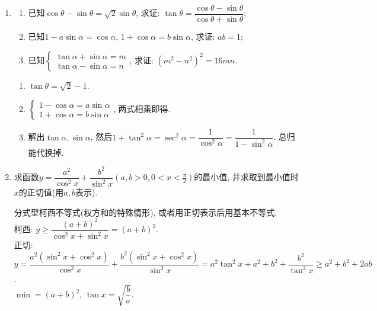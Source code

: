 \begin{enumerate}
\begin{jieda}
\begin{enumerate}[(1)]
\item $\iff\sin\alpha+\cos\alpha=2\sin\alpha-2\cos\alpha\iff\tan\alpha=3$. \\
$E=\dfrac{\sin\alpha\cos\alpha}{\sin^2\alpha+\cos^2\alpha}=\dfrac{\tan\alpha}{\tan^2\alpha+1}=\dfrac{3}{10}$. 
\end{enumerate}
\end{jieda}

\item
\begin{enumerate}[(1)]
\item 已知$\cos\theta-\sin\theta=\sqrt{2}\sin\theta$, 求证: $\tan\theta=\dfrac{\cos\theta-\sin\theta}{\cos\theta+\sin\theta}$;
\item 已知$1-a\sin\alpha=\cos\alpha$, $1+\cos\alpha=b\sin\alpha$, 求证: $ab=1$; 
\item 已知$\begin{cases}
\tan\alpha+\sin\alpha=m\\
\tan\alpha-\sin\alpha=n
\end{cases}$, 求证: $(m^2-n^2)^2=16mn$. 
\end{enumerate}
\begin{jieda}
\begin{enumerate}[(1)]
\item $\tan\theta=\sqrt{2}-1$. 
\item $\begin{cases}
1-\cos\alpha=a\sin\alpha\\
1+\cos\alpha=b\sin\alpha
\end{cases}$, 两式相乘即得. 
\item 解出$\tan\alpha,\sin\alpha$, 然后$1+\tan^2\alpha=\sec^2\alpha=\dfrac{1}{\cos^2\alpha}=\dfrac{1}{1-\sin^2\alpha}$. 总归能代换掉. 
\end{enumerate}
\end{jieda}

\item 求函数$y=\dfrac{a^2}{\cos^2x}+\dfrac{b^2}{\sin^2x}(a,b>0,0<x<\frac{\pi}{2})$的最小值, 并求取到最小值时$x$的正切值(用$a,b$表示). 
\begin{jieda}
分式型柯西不等式(权方和的特殊情形), 或者用正切表示后用基本不等式. \\
柯西: $y\geq\dfrac{(a+b)^2}{\cos^2x+\sin^2x}=(a+b)^2$. \\
正切: $y=\dfrac{a^2(\sin^2x+\cos^2x)}{\cos^2x}+\dfrac{b^2(\sin^2x+\cos^2x)}{\sin^2x}=a^2\tan^2x+a^2+b^2+\dfrac{b^2}{\tan^2x}\geq a^2+b^2+2ab$. \\
\da $\min=(a+b)^2$, $\tan{x}=\sqrt{\dfrac{b}{a}}$. 
\end{jieda}


\end{enumerate}
